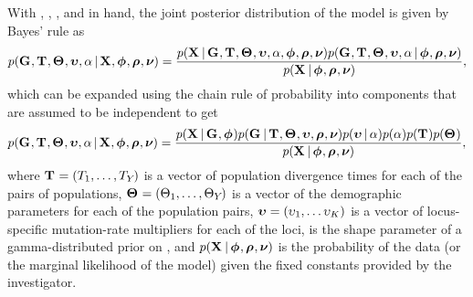 \begin{linenomath}
With \alignmentVector, \hkyModelVector, \ploidyScalarVector, and
\mutationRateScalarConstantVector in hand, the joint posterior distribution
of the model is given by Bayes' rule as
\begin{equation}
    p(\geneTreeVector, \divTimeMapVector, \demographicParamVector, 
    \locusMutationRateScalarVector, \locusRateHetShapeParameter \given
    \alignmentVector, \hkyModelVector, \ploidyScalarVector,
    \mutationRateScalarConstantVector) =
    \frac{p(\alignmentVector \given \geneTreeVector, \divTimeMapVector,
        \demographicParamVector, \locusMutationRateScalarVector,
        \locusRateHetShapeParameter, \hkyModelVector, \ploidyScalarVector,
        \mutationRateScalarConstantVector)
        p(\geneTreeVector, \divTimeMapVector, \demographicParamVector,
        \locusMutationRateScalarVector, \locusRateHetShapeParameter \given
        \hkyModelVector, \ploidyScalarVector,
        \mutationRateScalarConstantVector)}{
        p(\alignmentVector \given \hkyModelVector, \ploidyScalarVector,
        \mutationRateScalarConstantVector)},
    \label{eq:fullModelCompactJoint}
\end{equation}
which can be expanded using the chain rule of probability into components that
are assumed to be independent to get
\begin{equation}
    p(\geneTreeVector, \divTimeMapVector, \demographicParamVector, 
    \locusMutationRateScalarVector, \locusRateHetShapeParameter \given
    \alignmentVector, \hkyModelVector, \ploidyScalarVector,
    \mutationRateScalarConstantVector) =
    \frac{p(\alignmentVector \given \geneTreeVector, \hkyModelVector)
        p(\geneTreeVector \given \divTimeMapVector, \demographicParamVector,
        \locusMutationRateScalarVector, \ploidyScalarVector,
        \mutationRateScalarConstantVector)
        p(\locusMutationRateScalarVector \given \locusRateHetShapeParameter)
        p(\locusRateHetShapeParameter)
        p(\divTimeMapVector)
        p(\demographicParamVector)}{
        p(\alignmentVector \given \hkyModelVector, \ploidyScalarVector,
        \mutationRateScalarConstantVector)},
    \label{eq:fullModelCompact}
\end{equation}
where
$\mathbf{T_{}} = (T_{1}, \ldots, T_{Y_{}})$
is a vector of population divergence times for each of the \npairs{} pairs of
populations,
$\mathbf{\Theta_{}} = (\Theta_{1}, \ldots,
\Theta_{Y_{}})$
is a vector of the demographic parameters for each of the \npairs{} population
pairs,
$\boldsymbol{\upsilon} = (\upsilon_{1}, \ldots
\upsilon_{K})$
is a vector of locus-specific mutation-rate multipliers for each of the
\nlociTotal loci,
\locusRateHetShapeParameter is the shape parameter of a gamma-distributed
prior on \locusMutationRateScalar{}, and
$p(\alignmentVector \given \hkyModelVector, \ploidyScalarVector,
\mutationRateScalarConstantVector)$
is the probability of the data (or the marginal likelihood of the model) given
the fixed constants provided by the investigator.
\end{linenomath}


